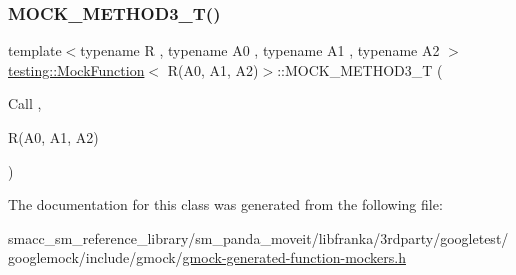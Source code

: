 \subsubsection{\texorpdfstring{M\+O\+C\+K\+\_\+\+M\+E\+T\+H\+O\+D3\+\_\+\+T()}{MOCK\_METHOD3\_T()}}
{\footnotesize\ttfamily template$<$typename R , typename A0 , typename A1 , typename A2 $>$ \\
\hyperlink{classtesting_1_1MockFunction}{testing\+::\+Mock\+Function}$<$ R(A0, A1, A2)$>$\+::M\+O\+C\+K\+\_\+\+M\+E\+T\+H\+O\+D3\+\_\+T (\begin{DoxyParamCaption}\item[{Call}]{,  }\item[{R(A0, A1, A2)}]{ }\end{DoxyParamCaption})}



The documentation for this class was generated from the following file\+:\begin{DoxyCompactItemize}
\item 
smacc\+\_\+sm\+\_\+reference\+\_\+library/sm\+\_\+panda\+\_\+moveit/libfranka/3rdparty/googletest/googlemock/include/gmock/\hyperlink{gmock-generated-function-mockers_8h}{gmock-\/generated-\/function-\/mockers.\+h}\end{DoxyCompactItemize}
